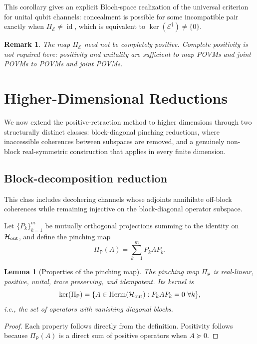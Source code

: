 \documentclass[
aps,pra,twocolumn,10pt,
superscriptaddress,longbibliography,floatfix
]{revtex4-2}
\DeclareMathOperator{\Herm}{Herm}
\DeclareMathOperator{\id}{id}
\newtheorem{lemma}[theorem]{Lemma}
\newtheorem{remark}[theorem]{Remark}
\begin{document}
This corollary gives an explicit Bloch-space realization of the universal criterion for unital qubit channels: concealment is possible for some incompatible pair exactly when $\Pi_{\mathcal E}\neq\id$, which is equivalent to $\ker(\mathcal E^\dagger)\neq\{0\}$.

\begin{remark}
The map $\Pi_{\mathcal E}$ need not be completely positive. Complete positivity is not required here: positivity and unitality are sufficient to map POVMs and joint POVMs to POVMs and joint POVMs.
\end{remark}

\section{Higher-Dimensional Reductions}
\label{sec:higher_dim}

We now extend the positive-retraction method to higher dimensions through two structurally distinct classes: block-diagonal pinching reductions, where inaccessible coherences between subspaces are removed, and a genuinely non-block real-symmetric construction that applies in every finite dimension.

\subsection{Block-decomposition reduction}

This class includes decohering channels whose adjoints annihilate off-block coherences while remaining injective on the block-diagonal operator subspace.

Let $\{P_k\}_{k=1}^m$ be mutually orthogonal projections summing to the identity on $\mathcal H_{\rm out}$, and define the pinching map
\[
\Pi_{\mathsf P}(A)=\sum_{k=1}^m P_k A P_k.
\]

\begin{lemma}[Properties of the pinching map]
The pinching map $\Pi_{\mathsf P}$ is real-linear, positive, unital, trace preserving, and idempotent. Its kernel is
\[
\ker(\Pi_{\mathsf P}) = \{A\in\Herm(\mathcal H_{\rm out}): P_k A P_k=0\ \forall k\},
\]
i.e., the set of operators with vanishing diagonal blocks.
\end{lemma}

\begin{proof}
Each property follows directly from the definition. Positivity follows because $\Pi_{\mathsf P}(A)$ is a direct sum of positive operators when $A\succeq0$.
\end{proof}
\end{document}
